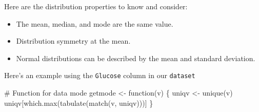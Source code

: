 \documentclass[
  letterpaper,
  DIV=11,
  numbers=noendperiod]{scrreprt}
\newenvironment{Shaded}{\begin{snugshade}}{\end{snugshade}}
\newcommand{\CommentTok}[1]{\textcolor[rgb]{0.37,0.37,0.37}{#1}}
\newcommand{\ControlFlowTok}[1]{\textcolor[rgb]{0.00,0.23,0.31}{#1}}
\newcommand{\FunctionTok}[1]{\textcolor[rgb]{0.28,0.35,0.67}{#1}}
\newcommand{\NormalTok}[1]{\textcolor[rgb]{0.00,0.23,0.31}{#1}}
\newcommand{\OtherTok}[1]{\textcolor[rgb]{0.00,0.23,0.31}{#1}}
\begin{document}
Here are the distribution properties to know and consider:

\begin{itemize}
\item
  The mean, median, and mode are the same value.
\item
  Distribution symmetry at the mean.
\item
  Normal distributions can be described by the mean and standard
  deviation.
\end{itemize}

Here's an example using the \texttt{Glucose} column in our
\texttt{dataset}

\begin{Shaded}
\begin{Highlighting}[]
\CommentTok{\# Function for data mode}
\NormalTok{getmode }\OtherTok{\textless{}{-}} \ControlFlowTok{function}\NormalTok{(v) \{}
\NormalTok{   uniqv }\OtherTok{\textless{}{-}} \FunctionTok{unique}\NormalTok{(v)}
\NormalTok{   uniqv[}\FunctionTok{which.max}\NormalTok{(}\FunctionTok{tabulate}\NormalTok{(}\FunctionTok{match}\NormalTok{(v, uniqv)))]}
\NormalTok{\}}


\end{Highlighting}
\end{Shaded}
\end{document}
